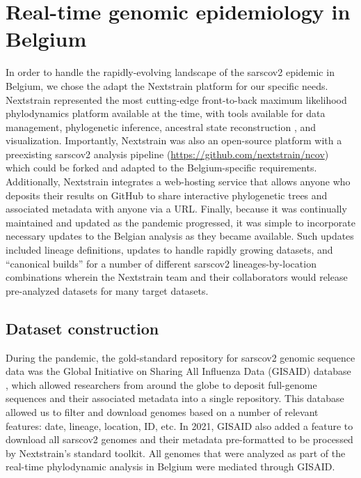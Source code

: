 \section{Real-time genomic epidemiology in Belgium}\label{sec:nextstrainBE}
In order to handle the rapidly-evolving landscape of the \gls{sarscov2} epidemic in Belgium, we chose the adapt the Nextstrain \citep{hadfield2018nextstrain} platform for our specific needs.
Nextstrain represented the most cutting-edge front-to-back maximum likelihood phylodynamics platform available at the time, with tools available for data management, phylogenetic inference, ancestral state reconstruction \citep{huddleston2021augur}, and visualization.
Importantly, Nextstrain was also an open-source platform with a preexisting \gls{sarscov2} analysis pipeline (\url{https://github.com/nextstrain/ncov}) which could be forked and adapted to the Belgium-specific requirements.
Additionally, Nextstrain integrates a web-hosting service that allows anyone who deposits their results on GitHub to share interactive phylogenetic trees and associated metadata with anyone via a URL.
Finally, because it was continually maintained and updated as the pandemic progressed, it was simple to incorporate necessary updates to the Belgian analysis as they became available.
Such updates included lineage definitions, updates to handle rapidly growing datasets, and ``canonical builds'' for a number of different \gls{sarscov2} lineages-by-location combinations wherein the Nextstrain team and their collaborators would release pre-analyzed datasets for many target datasets.

\subsection{Dataset construction}
During the pandemic, the gold-standard repository for \gls{sarscov2} genomic sequence data was the Global Initiative on Sharing All Influenza Data (GISAID) database \citep{shu2017gisaid}, which allowed researchers from around the globe to deposit full-genome sequences and their associated metadata into a single repository.
This database allowed us to filter and download genomes based on a number of relevant features: date, lineage, location, ID, etc.
In 2021, GISAID also added a feature to download all \gls{sarscov2} genomes and their metadata pre-formatted to be processed by Nextstrain's standard toolkit.
All genomes that were analyzed as part of the real-time phylodynamic analysis in Belgium were mediated through GISAID.

